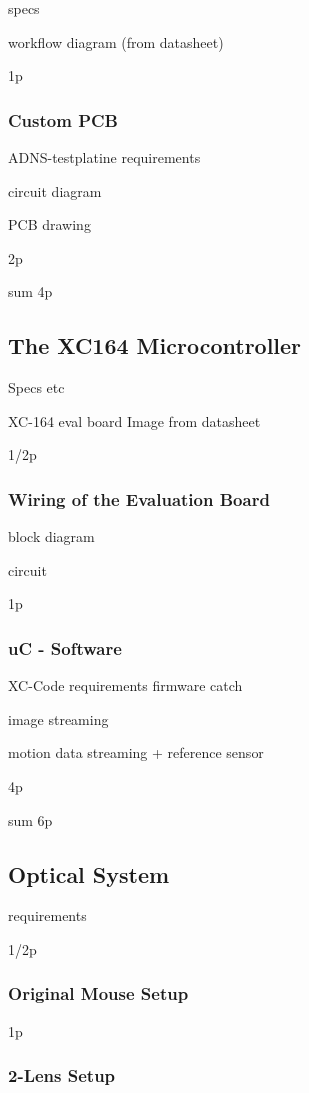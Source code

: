 \documentclass[12pt,a4paper]{article}
\begin{document}
specs

workflow diagram (from datasheet)

1p

\subsubsection{Custom PCB}
ADNS-testplatine
  requirements

  circuit diagram

  PCB drawing

2p

sum 4p
  
\subsection{The XC164 Microcontroller}

Specs etc

XC-164 eval board 
  Image from datasheet

1/2p

\subsubsection{Wiring of the Evaluation Board}

  block diagram

  circuit

1p

\subsubsection{uC - Software}

  XC-Code
    requirements
    firmware catch

    image streaming

    motion data streaming
      + reference sensor

4p

sum 6p

\subsection{Optical System}
  requirements

1/2p

\subsubsection{Original Mouse Setup}

1p

\subsubsection{2-Lens Setup}
\end{document}

